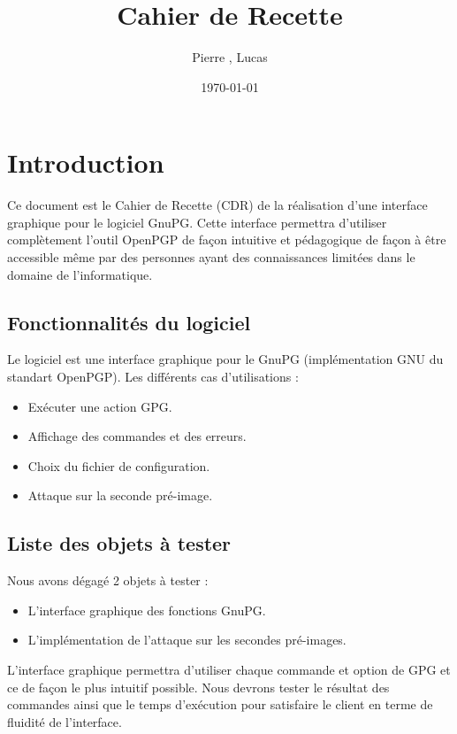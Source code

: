\documentclass{../res/univ-projet}
\title{Cahier de Recette}
\author{Pierre \bsc{Balmelle}, Lucas \bsc{Barbay}}
\date{\today}
\begin{document}
\maketitle
\newpage
\tableofcontents
\newpage

\section{Introduction}

Ce document est le Cahier de Recette (CDR) de la réalisation d'une interface graphique pour le logiciel GnuPG.
Cette interface permettra d'utiliser complètement l'outil OpenPGP de façon intuitive et pédagogique de façon 
à être accessible même par des personnes ayant des connaissances limitées dans le domaine de l'informatique. 

\subsection{Fonctionnalités du logiciel}
Le logiciel est une interface graphique pour le GnuPG (implémentation GNU du standart OpenPGP).
Les différents cas d'utilisations :
\begin{itemize}
 \item Exécuter une action GPG.
 \item Affichage des commandes et des erreurs.
 \item Choix du fichier de configuration.
 \item Attaque sur la seconde pré-image.
\end{itemize}

\subsection{Liste des objets à tester}
Nous avons dégagé 2 objets à tester : 
\begin{itemize}
 \item L'interface graphique des fonctions GnuPG.
 \item L'implémentation de l'attaque sur les secondes pré-images. 
\end{itemize}

L'interface graphique permettra d'utiliser chaque commande et option de GPG et ce de façon le plus intuitif possible. Nous
devrons tester le résultat des commandes ainsi que le temps d'exécution pour satisfaire le client en terme de fluidité de l'interface.
\end{document}
